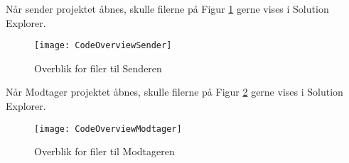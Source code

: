 \documentclass[Main]{subfiles}
\begin{document}
Når sender projektet åbnes, skulle filerne på Figur \ref{Fig:CodeOverviewSender} gerne vises i Solution Explorer.

\begin{figure}[H]
\centering
\texttt{[image: CodeOverviewSender]}
\caption{Overblik for filer til Senderen}
\label{Fig:CodeOverviewSender}
\end{figure}

Når Modtager projektet åbnes, skulle filerne på Figur \ref{Fig:CodeOverviewModtager} gerne vises i Solution Explorer.

\begin{figure}[H]
\centering
\texttt{[image: CodeOverviewModtager]}
\caption{Overblik for filer til Modtageren}
\label{Fig:CodeOverviewModtager}
\end{figure}
\end{document}
